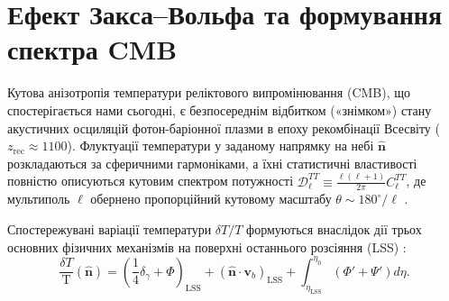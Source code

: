 \documentclass[12pt, a4paper]{article}
\begin{document}
\section{Ефект Закса--Вольфа та формування спектра CMB}
\label{sec:sachs}

Кутова анізотропія температури реліктового випромінювання (CMB), що спостерігається нами сьогодні, є безпосереднім відбитком («знімком») стану акустичних осциляцій фотон-баріонної плазми в епоху рекомбінації Всесвіту ($z_{\mathrm{rec}} \approx 1100$). Флуктуації температури у заданому напрямку на небі $\hat{\mathbf{n}}$ розкладаються за сферичними гармоніками, а їхні статистичні властивості повністю описуються кутовим спектром потужності $\mathcal{D}_\ell^{TT} \equiv \frac{\ell(\ell+1)}{2\pi}C_\ell^{TT}$, де мультиполь $\ell$ обернено пропорційний кутовому масштабу $\theta \sim 180^\circ / \ell$ \cite{dodelson_2020}.

Спостережувані варіації температури $\delta T / T$ формуються внаслідок дії трьох основних фізичних механізмів на поверхні останнього розсіяння (LSS) \cite{hu_sugiyama_1995}:
\begin{equation}\label{eq:cmb_sources}
  \frac{\delta T}{\text{T}}(\hat{\mathbf{n}}) = \left( \frac{1}{4}\delta_\gamma + \Phi \right)_{\mathrm{LSS}} + \left( \hat{\mathbf{n}} \cdot \mathbf{v}_b \right)_{\mathrm{LSS}} + \int_{\eta_{\mathrm{LSS}}}^{\eta_0} \left( \Phi' + \Psi' \right) d\eta.
\end{equation}
\end{document}
